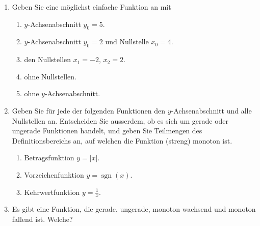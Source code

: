 \begin{ueb}
\begin{enumerate}
        \item Geben Sie eine möglichst einfache Funktion an mit
              \begin{enumerate}
                  \item \(y\)-Achsenabschnitt \(y_0=5\).
                  \item \(y\)-Achsenabschnitt \(y_0=2\) und Nullstelle \(x_0=4\).
                  \item den Nullstellen \(x_1=-2\), \(x_2=2\).
                  \item ohne Nullstellen.
                  \item ohne \(y\)-Achsenabschnitt.
              \end{enumerate}

        \item Geben Sie für jede der folgenden Funktionen den
              \(y\)-Achsenabschnitt und alle Nullstellen an.
              Entscheiden Sie ausserdem, ob es sich um gerade oder
              ungerade Funktionen handelt, und geben Sie Teilmengen
              des Definitionsbereichs an, auf welchen die Funktion
              (streng) monoton ist.
              \begin{enumerate}
                  \item Betragsfunktion \(y=|x|\).
                  \item Vorzeichenfunktion \(y=\operatorname{sgn}(x)\).
                  \item Kehrwertfunktion \(y=\frac{1}{x}\).
              \end{enumerate}



        \item Es gibt eine Funktion, die gerade, ungerade,
              monoton wachsend und monoton fallend ist. Welche?
    \end{enumerate}
\end{ueb}

